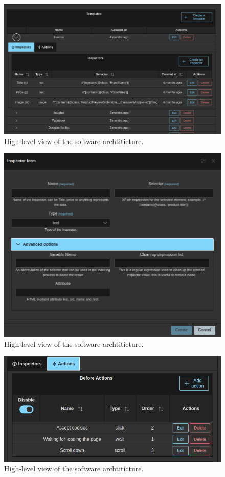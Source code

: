 \begin{figure}[h]	
     \centering
     \includegraphics[width=13cm]{images/demo-3.png}
     \caption{High-level view of the software archtiticture.}
     \label{fig:software-arch}
\end{figure}

\begin{figure}[h]	
     \centering
     \includegraphics[width=13cm]{images/demo-4.png}
     \caption{High-level view of the software archtiticture.}
     \label{fig:software-arch}
\end{figure}

\begin{figure}[h]	
     \centering
     \includegraphics[width=13cm]{images/demo-5.png}
     \caption{High-level view of the software archtiticture.}
     \label{fig:software-arch}
\end{figure}

